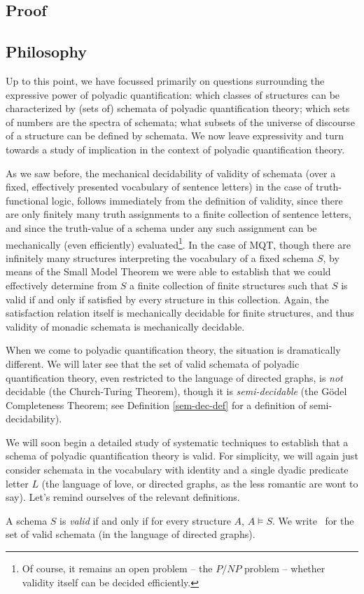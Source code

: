 \subsection{Proof}\label{pqt-proof-subsec}
\subsection*{Philosophy}
Up to this point, we have focussed primarily on questions surrounding the expressive power of polyadic quantification: which classes of structures can be characterized by (sets of) schemata of polyadic quantification theory; which sets of numbers are the spectra of schemata; what subsets of the universe of discourse of a structure can be defined by schemata. We now leave expressivity and turn towards a study of implication in the context of polyadic quantification theory. 

As we saw before, the mechanical decidability of validity of schemata (over a fixed, effectively presented vocabulary of sentence letters)
in the case of truth-functional logic, follows immediately from 
the definition of validity, since there are only finitely many truth assignments to a finite collection of sentence letters, and since the truth-value of a schema under any such assignment can be mechanically (even efficiently) evaluated\footnote{Of course, it remains an open problem  -- the $P/NP$ problem -- whether validity itself can be decided efficiently.}. In the case of MQT, though there are infinitely many structures interpreting the vocabulary of a fixed schema $S$, by means of the Small Model Theorem we were able to establish that we could effectively determine from $S$ a finite collection of finite structures such that $S$ is valid if and only if satisfied by every structure in this collection. Again, the satisfaction relation itself is mechanically decidable for finite structures, and thus validity of monadic schemata is mechanically decidable.

When we come to polyadic quantification theory, the situation is dramatically different. We will later see that the set of valid schemata of polyadic quantification theory, even restricted to the language of directed graphs, is \emph{not} decidable (the Church-Turing Theorem), though it is \emph{semi-decidable} (the G\"{o}del Completeness Theorem; see Definition \ref{sem-dec-def} for a definition of semi-decidability). 

We will soon begin a detailed study of systematic techniques to establish that a schema of polyadic quantification theory is valid. For simplicity, we will again just consider schemata in the vocabulary with identity and a single dyadic predicate letter $L$ (the language of love, or directed graphs, as the less romantic are wont to say). Let's remind ourselves of the relevant definitions.
\begin{definition}
A schema $S$ is \emph{valid} if and only if for every structure $A$, $A\models S$. We write \val\ for the set of valid schemata (in the language of directed graphs). 
\end{definition}


